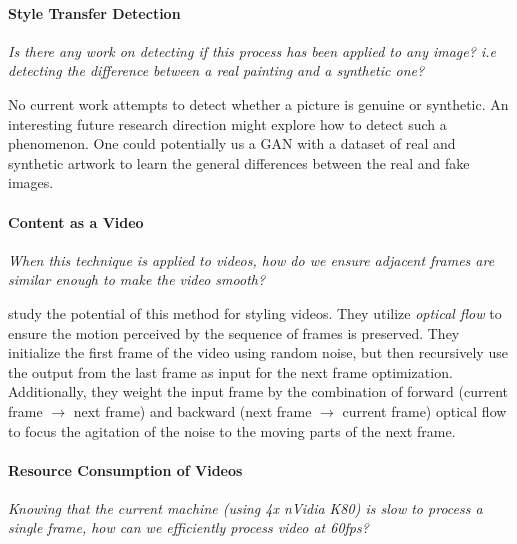 \documentclass{article}
\begin{document}
\paragraph{Style Transfer Detection} \textit{Is there any work on detecting
if this process has been applied to any image? i.e detecting the difference
between a real painting and a synthetic one?}

No current work attempts to detect whether a picture is genuine or synthetic.
An interesting future research direction might explore how to detect such a
phenomenon. One could potentially us a \ac{GAN} with a dataset of real and
synthetic artwork to learn the general differences between the real and fake
images.

\paragraph{Content as a Video} \textit{When this technique is applied to
videos, how do we ensure adjacent frames are similar enough to make the video
smooth?}

\cite{2016arXiv160408610R} study the potential of this method for styling
videos. They utilize \textit{optical flow} to ensure the motion perceived by
the sequence of frames is preserved. They initialize the first frame of the
video using random noise, but then recursively use the output from the last
frame as input for the next frame optimization. Additionally, they weight the
input frame by the combination of forward (current frame $\to$ next frame) and
backward (next frame $\to$ current frame) optical flow to focus the agitation
of the noise to the moving parts of the next frame.

\paragraph{Resource Consumption of Videos} \textit{Knowing that the current
machine (using 4x nVidia K80) is slow to process a single frame, how can we
efficiently process video at 60fps?}








\end{document}
